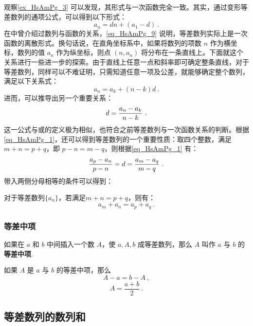 观察\autoref{ex_HsAmPg_3} 可以发现，其形式与一次函数完全一致。其实，通过变形等差数列的通项公式，可以得到以下形式：
\begin{equation}\label{eq_HsAmPg_9}
a_n=dn+(a_1-d)~.
\end{equation}
在中曾介绍过数列与函数的关系，\autoref{eq_HsAmPg_9} 说明，等差数列实际上是一次函数的离散形式。换句话说，在直角坐标系中，如果将数列的项数 $n$ 作为横坐标，数列的值 $a_n$ 作为纵坐标，则点 $(n, a_n)$ 将分布在一条直线上。下面就这个关系进行一些进一步的探索。由于直线上任意一点和斜率即可确定整条直线，对于等差数列，同样可以不难证明，只需知道任意一项及公差，就能够确定整个数列，满足以下关系式：
\begin{equation}
a_n=a_k+(n-k)d~.
\end{equation}
进而，可以推导出另一个重要关系：
\begin{equation}\label{eq_HsAmPg_1}
d={a_n-a_k\over n-k}~.
\end{equation}
这一公式与或的定义极为相似，也符合之前等差数列与一次函数关系的判断。根据\autoref{eq_HsAmPg_1}，还可以得到等差数列的一个重要性质：取四个整数，满足 $m+n=p+q$，即 $p-n=m-q$，则根据\autoref{eq_HsAmPg_1} 有：
\begin{equation}
{a_p-a_n\over p-n}=d={a_m-a_q\over m-q}~.
\end{equation}
带入两侧分母相等的条件可以得到：
\begin{corollary}{}\label{cor_HsAmPg_1}
对于等差数列$\{a_n\}$，若满足$m+n=p+q$，则有：
\begin{equation}
a_m+a_n=a_p+a_q~.
\end{equation}
\end{corollary}
\subsubsection{等差中项}

如果在 $a$ 和 $b$ 中间插入一个数 $A$，使 $a,A,b$ 成等差数列，那么 $A$ 叫作 $a$ 与 $b$ 的\textbf{等差中项}.

如果 $A$ 是 $a$ 与 $b$ 的等差中项，那么
\begin{equation}
A - a = b - A~,
\end{equation}
\begin{equation}
A = \frac{a+b}{2}~.
\end{equation}

\subsection{等差数列的数列和}

